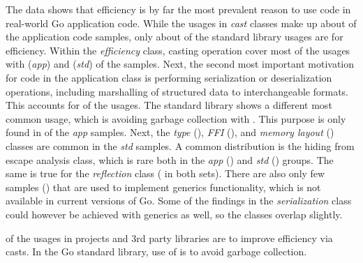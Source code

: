 The data shows that efficiency is by far the most prevalent reason to use \unsafe{} code in real-world Go application
code.
While the usages in \textit{cast} classes make up about  of the application code samples, only about
 of the standard library usages are for efficiency.
Within the \textit{efficiency} class, casting operation cover most of the usages with  (\textit{app}) and
 (\textit{std}) of the samples.
Next, the second most important motivation for \unsafe{} code in the application class is performing serialization or
deserialization operations, including marshalling of structured data to interchangeable formats.
This accounts for  of the usages.
The standard library shows a different most common usage, which is avoiding garbage collection with .
This purpose is only found in  of the \textit{app} samples.
Next, the \textit{type} (), \textit{\acrshort{FFI}} (), and \textit{memory layout}
() classes are common in the \textit{std} samples.
A common distribution is the hiding from escape analysis class, which is rare both in the \textit{app}
() and \textit{std} () groups.
The same is true for the \textit{reflection} class ( in both sets).
There are also only few samples () that are used to implement generics functionality, which is not
available in current versions of Go.
Some of the findings in the \textit{serialization} class could however be achieved with generics as well, so the classes
overlap slightly.

\begin{tcolorbox}[boxsep=3pt, enlarge top by=5pt, title=Answer to~\ref{rq:purpose}]
     of the \unsafe{} usages in projects and 3rd party libraries are to improve efficiency via
    \unsafe{} casts.
    In the Go standard library,  use of \unsafe{} is to avoid garbage collection.
\end{tcolorbox}

